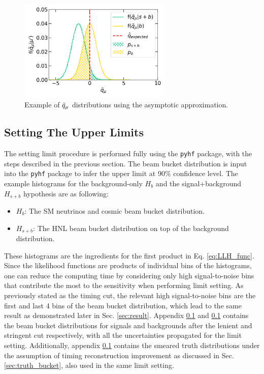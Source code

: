\begin{figure}[hp!] 
\centering    
\includegraphics[width=0.65\textwidth]{asymtotic}
\caption[stat_asymptotic]{Example of $\Tilde{q}_\mu$ distributions using the asymptotic approximation.}
\label{fig:stat_asymptotic}
\end{figure}

\subsection{Setting The Upper Limits}

The setting limit procedure is performed fully using the \texttt{pyhf} package, with the steps described in the previous section.
The beam bucket distribution is input into the \texttt{pyhf} package to infer the upper limit at 90\% confidence level.
The example histograms for the background-only $H_{b}$ and the signal+background $H_{s+b}$ hypothesis are as following:
\begin{itemize}
    \item $H_b$: The SM neutrinos and cosmic beam bucket distribution.
    \item $H_{s+b}$: The HNL beam bucket distribution on top of the background distribution. 
\end{itemize}

These histograms are the ingredients for the first product in Eq. \ref{eq:LLH_func}.
Since the likelihood functions are products of individual bins of the histograms, one can reduce the computing time by considering only high signal-to-noise bins that contribute the most to the sensitivity when performing limit setting. 
As previously stated as the timing cut, the relevant high signal-to-noise bins are the first and last 4 bins of the beam bucket distribution, which lead to the same result as demonstrated later in Sec. \ref{sec:result}.
Appendix \ref{} and \ref{} contains the beam bucket distributions for signals and backgrounds after the lenient and stringent cut respectively, with all the uncertainties propagated for the limit setting.
Additionally, appendix \ref{} contains the smeared truth distributions under the assumption of timing reconstruction improvement as discussed in Sec. \ref{sec:truth_bucket}, also used in the same limit setting.

